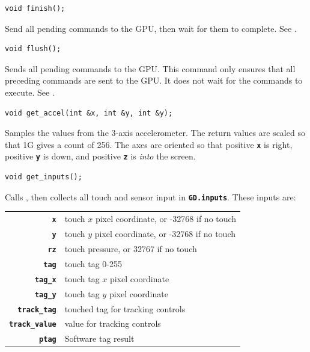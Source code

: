 \documentclass[10pt]{book}
\newcommand{\mach}[1]{\texttt{\textbf{#1}}}
\begin{document}
\begin{framed}
\begin{verbatim}
void finish();
\end{verbatim}
\end{framed}

Send all pending commands to the GPU, then wait for them to complete.
See .

\newpage
{}

\begin{framed}
\begin{verbatim}
void flush();
\end{verbatim}
\end{framed}

Sends all pending commands to the GPU.
This command only ensures that all preceding commands are sent to the GPU.
It does not wait for the commands to execute. See .


\begin{framed}
\begin{verbatim}
void get_accel(int &x, int &y, int &y);
\end{verbatim}
\end{framed}

Samples the values from the 3-axis accelerometer.
The return values are scaled so that 1G gives a count of 256.
The axes are oriented so that positive \mach{x} is right,
positive \mach{y} is down, and positive \mach{z} is \emph{into} the screen.


\begin{framed}
\begin{verbatim}
void get_inputs();
\end{verbatim}
\end{framed}

Calls , then
collects all touch and sensor input in \mach{GD.inputs}.
These inputs are:

\vspace{10pt}
\begin{tabular}{rl}
\mach{x} & touch $x$ pixel coordinate, or -32768 if no touch \\
\mach{y} & touch $y$ pixel coordinate, or -32768 if no touch \\
\mach{rz} & touch pressure, or 32767 if no touch \\
\mach{tag} & touch tag 0-255 \\
\mach{tag\_x} & touch tag $x$ pixel coordinate \\
\mach{tag\_y} & touch tag $y$ pixel coordinate \\
\mach{track\_tag} & touched tag for tracking controls \\
\mach{track\_value} & value for tracking controls \\
\mach{ptag} & Software tag result \\
\end{tabular}
\end{document}
